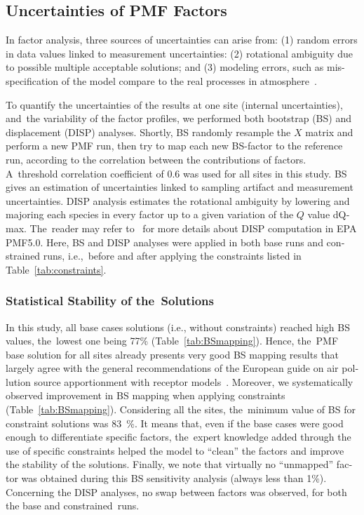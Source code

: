 \begin{otherlanguage}{english}
\subsection{Uncertainties of PMF Factors}%
\label{sub:uncertainties_of_pmf_factors}

In factor analysis, three sources of uncertainties can arise from: (1) random errors in
data values linked to measurement uncertainties: (2) rotational ambiguity due to possible
multiple acceptable solutions; and  (3) modeling errors, such as mis-specification of the
model compare to the real processes in atmosphere~\autocite{belisEuropean2014}.

To quantify the uncertainties of the results at one site (internal uncertainties), and~the
variability of the factor profiles, we performed both bootstrap (BS) and displacement
(DISP) analyses. Shortly, BS randomly resample the $X$ matrix and perform a new PMF run,
then try to map each new BS-factor to the reference run, according to the correlation
between the contributions of factors. A~threshold correlation coefficient of 0.6 was used
for all sites in this study. BS gives an estimation of uncertainties linked to sampling
artifact and measurement uncertainties. DISP analysis estimates the rotational ambiguity
by lowering and majoring each species in every factor up to a given variation of the $Q$
value dQmax. The~reader may refer to~\textcite{paateroMethods2014} for more details about
DISP computation in EPA PMF5.0. Here, BS and DISP analyses were applied in both base runs
and constrained runs, i.e.,~before and after applying the constraints listed in
Table~\ref{tab:constraints}.


\subsubsection{Statistical Stability of the~Solutions}%
\label{ssub:statistical_stability_of_the_solutions}

In this study, all base cases solutions (i.e., without constraints) reached high BS
values, the~lowest one being {77}{\%} (Table~\ref{tab:BSmapping}).  Hence, the~PMF base
solution for all sites already presents very good BS mapping results that largely agree
with the general recommendations of the European guide on air pollution source
apportionment with receptor models~\autocite{belisEuropean2014}. Moreover, we
systematically observed improvement in BS mapping when applying constraints
(Table~\ref{tab:BSmapping}).  Considering all the sites, the~minimum value of BS for
constraint solutions was \SI{83}{\percent}. It means that, even if the base cases were
good enough to differentiate specific factors, the~expert knowledge added through the use
of specific constraints helped the model to ``clean'' the factors and improve the
stability of the solutions. Finally, we note that virtually no ``unmapped'' factor was
obtained during this BS sensitivity analysis (always less than {1}{\%}).  Concerning the
DISP analyses, no swap between factors was observed,   for both the base and
constrained~runs.


\end{otherlanguage}
